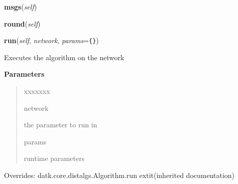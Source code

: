     \label{datk:core:distalgs:Synchronous_Algorithm:msgs}

    \vspace{0.5ex}

\hspace{.8\funcindent}\begin{boxedminipage}{\funcwidth}

    \raggedright \textbf{msgs}(\textit{self})

\setlength{\parskip}{2ex}
\setlength{\parskip}{1ex}
    \end{boxedminipage}

    \label{datk:core:distalgs:Synchronous_Algorithm:round}

    \vspace{0.5ex}

\hspace{.8\funcindent}\begin{boxedminipage}{\funcwidth}

    \raggedright \textbf{round}(\textit{self})

\setlength{\parskip}{2ex}
\setlength{\parskip}{1ex}
    \end{boxedminipage}

    \vspace{0.5ex}

\hspace{.8\funcindent}\begin{boxedminipage}{\funcwidth}

    \raggedright \textbf{run}(\textit{self}, \textit{network}, \textit{params}={\tt \texttt{\{}\texttt{\}}})

\setlength{\parskip}{2ex}
    Executes the algorithm on the network

\setlength{\parskip}{1ex}
      \textbf{Parameters}
      \vspace{-1ex}

      \begin{quote}
        \begin{Ventry}{xxxxxxx}

          \item[network]

          the parameter to run in

          \item[params]

          runtime parameters

        \end{Ventry}

      \end{quote}

      Overrides: datk.core.distalgs.Algorithm.run 	extit{(inherited documentation)}

    \end{boxedminipage}

